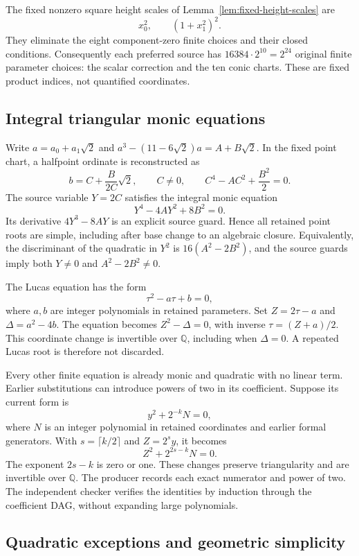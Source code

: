 \documentclass[11pt]{article}
\theoremstyle{definition}
\begin{document}
The fixed nonzero square height scales of
Lemma~\ref{lem:fixed-height-scales} are
\[
                       x_0^2,\qquad (1+x_1^2)^2.
\]
They eliminate the eight component-zero finite choices and their
closed conditions.  Consequently each preferred source has
$16384\cdot2^{10}=2^{24}$ original finite parameter choices:
the scalar correction and the ten conic charts.  These are
fixed product indices, not quantified coordinates.

\subsection{Integral triangular monic equations}

Write $a=a_0+a_1\sqrt2$ and
$a^3-(11-6\sqrt2)a=A+B\sqrt2$.  In the fixed point chart, a
halfpoint ordinate is reconstructed as
\[
 b=C+\frac{B}{2C}\sqrt2,\qquad C\ne0,
 \qquad C^4-AC^2+\frac{B^2}{2}=0.
\]
The source variable $Y=2C$ satisfies the integral monic equation
\[
                         Y^4-4AY^2+8B^2=0.
\]
Its derivative $4Y^3-8AY$ is an explicit source guard.  Hence
all retained point roots are simple, including after base change
to an algebraic closure.  Equivalently, the discriminant of the
quadratic in $Y^2$ is $16(A^2-2B^2)$, and the source guards
imply both $Y\ne0$ and $A^2-2B^2\ne0$.

The Lucas equation has the form
\[
                         \tau^2-a\tau+b=0,
\]
where $a,b$ are integer polynomials in retained parameters.
Set $Z=2\tau-a$ and $\Delta=a^2-4b$.  The equation becomes
$Z^2-\Delta=0$, with inverse $\tau=(Z+a)/2$.  This coordinate
change is invertible over $\mathbb Q$, including when
$\Delta=0$.  A repeated Lucas root is therefore not discarded.

Every other finite equation is already monic and quadratic with
no linear term.  Earlier substitutions can introduce powers of
two in its coefficient.  Suppose its current form is
\[
                          y^2+2^{-k}N=0,
\]
where $N$ is an integer polynomial in retained coordinates and
earlier formal generators.  With $s=\lceil k/2\rceil$ and
$Z=2^s y$, it becomes
\[
                          Z^2+2^{2s-k}N=0.
\]
The exponent $2s-k$ is zero or one.  These changes preserve
triangularity and are invertible over $\mathbb Q$.  The producer
records each exact numerator and power of two.  The independent
checker verifies the identities by induction through the
coefficient DAG, without expanding large polynomials.

\subsection{Quadratic exceptions and geometric simplicity}
\end{document}
